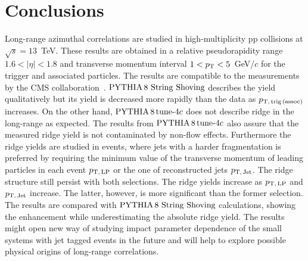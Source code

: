 
\section{Conclusions}
\label{sec:summary}
Long-range azimuthal correlations are studied in high-multiplicity pp collisions at $\sqrt{s} = 13$~TeV. These results are obtained in a relative pseudorapidity range $1.6 < |\eta| < 1.8$ and transverse momentum interval $1 < p_\mathrm{T} < 5$~GeV/$c$ for the trigger and associated particles. 
The results are compatible to the measurements by the CMS collaboration~\cite{Khachatryan:2015lva}.
$\mathrm{PYTHIA}\,8~\mathrm{String}~\mathrm{Shoving}$ describes the yield qualitatively but its yield is decreased more rapidly than the data as $p_\mathrm{T,\,trig\,(assoc)}$ increases. On the other hand, $\mathrm{PYTHIA}\,8\,\mathrm{tune}{\text -}4c$ does not describe ridge in the long-range as expected. The results from $\mathrm{PYTHIA}\,8\,\mathrm{tune}{\text -}4c$ also assure that the measured ridge yield is not contaminated by non-flow effects.
Furthermore the ridge yields are studied in events, where jets with a harder fragmentation is preferred by requiring the minimum value of the transverse momentum of leading particles in each event $p_\mathrm{T,\,LP}$ or the one of reconstructed jets $p_\mathrm{T,\,Jet}$. The ridge structure still persist with both selections. The ridge yields increase as $p_\mathrm{T,\,LP}$ and $p_\mathrm{T,\,Jet}$ increase. The latter, however, is more significant than the former selection. The results are compared with $\mathrm{PYTHIA}\,8~\mathrm{String}~\mathrm{Shoving}$ calculations, showing the enhancement while underestimating the absolute ridge yield.
The results might open new way of studying impact parameter dependence of the small systems with jet tagged events in the future and will help to explore possible physical origins of long-range correlations.